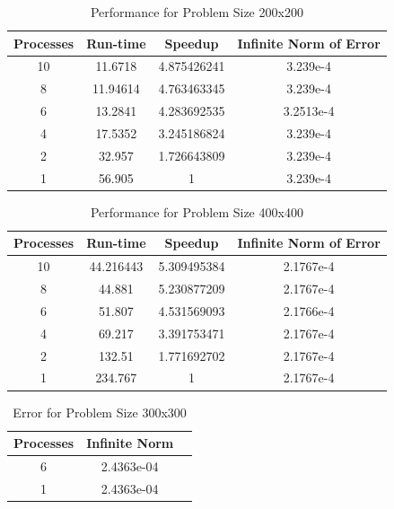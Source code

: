 \documentclass[12pt]{article}
\begin{document}
\begin{table}[htbp]
\centering
\caption{Performance for Problem Size 200x200}
\begin{tabular}{@{} cccc @{}}
\toprule
Processes & Run-time & Speedup & Infinite Norm of Error\\
\midrule
10 & 11.6718 & 4.875426241 & 3.239e-4 \\
8 & 11.94614 & 4.763463345 & 3.239e-4 \\
6 & 13.2841 & 4.283692535 & 3.2513e-4 \\
4 & 17.5352 & 3.245186824 & 3.239e-4 \\
2 & 32.957 & 1.726643809 & 3.239e-4 \\
1 & 56.905 & 1 & 3.239e-4 \\
\bottomrule
\end{tabular}
\end{table}

\begin{table}[htbp]
\centering
\caption{Performance for Problem Size 400x400}
\begin{tabular}{@{} cccc @{}}
\toprule
Processes & Run-time & Speedup & Infinite Norm of Error\\
\midrule
10 & 44.216443 & 5.309495384 & 2.1767e-4 \\
8 & 44.881 & 5.230877209 & 2.1767e-4 \\
6 & 51.807 & 4.531569093 & 2.1766e-4 \\
4 & 69.217 & 3.391753471 & 2.1767e-4 \\
2 & 132.51 & 1.771692702 & 2.1767e-4 \\
1 & 234.767 & 1 & 2.1767e-4 \\
\bottomrule
\end{tabular}
\end{table}

\begin{table}[htbp]
\centering
\caption{Error for Problem Size 300x300}
\label{tab:300by300}
\begin{tabular}{@{} ccc @{}}
\toprule
Processes & Infinite Norm \\
\midrule
6  & 2.4363e-04 \\
1 & 2.4363e-04 \\

\bottomrule
\end{tabular}
\end{table}
\end{document}
